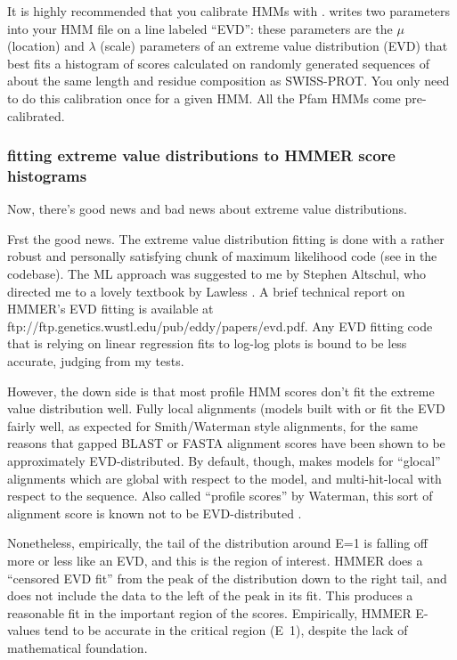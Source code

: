 It is highly recommended that you calibrate HMMs with
.  writes two parameters
into your HMM file on a line labeled ``EVD'': these parameters are the
$\mu$ (location) and $\lambda$ (scale) parameters of an extreme value
distribution (EVD) that best fits a histogram of scores calculated on
randomly generated sequences of about the same length and residue
composition as SWISS-PROT. You only need to do this calibration once
for a given HMM. All the Pfam HMMs come pre-calibrated.

\subsubsection{fitting extreme value distributions to HMMER score histograms}

Now, there's good news and bad news about extreme value distributions.

Frst the good news. The extreme value distribution fitting is done
with a rather robust and personally satisfying chunk of maximum
likelihood code (see  in the codebase). The ML
approach was suggested to me by Stephen Altschul, who directed me to a
lovely textbook by Lawless \cite{Lawless82}.  A brief technical report
on HMMER's EVD fitting is available at
{ftp://ftp.genetics.wustl.edu/pub/eddy/papers/evd.pdf}.  Any EVD
fitting code that is relying on linear regression fits to log-log
plots is bound to be less accurate, judging from my tests.

However, the down side is that most profile HMM scores don't fit the
extreme value distribution well. Fully local alignments (models built
with  or  fit the EVD fairly well,
as expected for Smith/Waterman style alignments, for the same reasons
that gapped BLAST or FASTA alignment scores have been shown to be
approximately EVD-distributed. By default, though, 
makes models for ``glocal'' alignments which are global with respect
to the model, and multi-hit-local with respect to the sequence.  Also
called ``profile scores'' by Waterman, this sort of alignment score is
known not to be EVD-distributed \cite{GoldsteinWaterman94}.

Nonetheless, empirically, the tail of the distribution around E=1 is
falling off more or less like an EVD, and this is the region of
interest. HMMER does a ``censored EVD fit'' from the peak of the
distribution down to the right tail, and does not include the data to
the left of the peak in its fit. This produces a reasonable fit in the
important region of the scores. Empirically, HMMER E-values tend to be
accurate in the critical region (E~1), despite the lack of
mathematical foundation.

